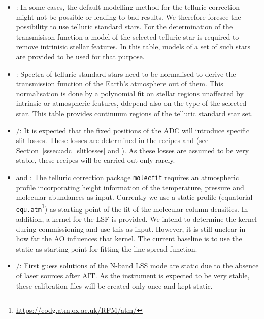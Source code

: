 \begin{itemize}
    \item \hyperref[dataitem:tssmodelcat]{}: In some cases, the default modelling method for the telluric correction might not be possible or leading to bad results. We therefore foresee the possibility to use telluric standard stars. For the determination of the transmisison function a model of the selected telluric star is required to remove intrinisic stellar features. In this table, models of a set of such stars are provided to be used for that purpose.
    \item \hyperref[dataitem:tssconttab]{}: Spectra of telluric standard stars need to be normalised to derive the transmission function of the Earth's atmosphere out of them. This normalisation is done by a polynomial fit on stellar regions unaffected by intrinsic or atmospheric features, ddepend also on the type of the selected star. This table provides continuum regions of the telluric standard star set.
    \item \hyperref[dataitem:lmadcslitloss]{}/\hyperref[dataitem:nadcslitloss]{}: It is expected that the fixed positions of the \ac{ADC} will introduce specific slit losses. These losses are determined in the recipes \hyperref[rec:metislmadcmslitloss]{} and \hyperref[rec:metisnadcmslitloss]{} (see Section~\ref{sssec:adc_slitlosses} and \cite{METIS-calibration_plan}). As these losses are assumed to be very stable, these recipes will be carried out only rarely.
    \item \hyperref[dataitem:atmprofile]{} and \hyperref[dataitem:lsfkernel]{}: The telluric correction package \texttt{molecfit} requires an atmospheric profile incorporating height information of the temperature, pressure and molecular abundances as input. Currently we use a static profile (equatorial \texttt{equ.atm}\footnote{\url{https://eodg.atm.ox.ac.uk/RFM/atm/}}) as starting point of the fit of the molecular column densities. In addition, a kernel for the \ac{LSF} is provided. We intend to determine the kernel during commissioning and use this as input. However, it is still unclear in how far the \ac{AO} influences that kernel. The current baseline is to use the static \hyperref[dataitem:lsfkernel]{} as starting point for fitting the line spread function.
    \item \hyperref[dataitem:nlssdistsol]{}/\hyperref[dataitem:nlsswaveguess]{}: First guess solutions of the N-band LSS mode are static due to the absence of laser sources after \ac{AIT}. As the instrument is expected to be very stable, these calibration files will be created only once and kept static.
\end{itemize}